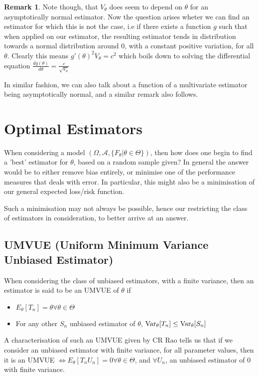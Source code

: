 \documentclass[12pt]{book}
\theoremstyle{definition}
\newtheorem*{remark}{Remark}
\begin{document}
\begin{remark}
    Note though, that $V_{\theta}$ does seem to depend on $\theta$ for an asymptotically normal estimator. Now the question arises wheter we can find an estimator for which this is not the case, i.e if there exists a function $g$ such that when applied on our estimator, the resulting estimator tends in distribution towards a normal distribution around 0, with a constant positive variation, for all $\theta$. Clearly this means $g'(\theta)^2 V_{\theta} = c^2$ which boils down to solving the differential equation $\frac{d g(\theta)}{d\theta} = \frac{c}{\sqrt{V_{\theta}}}$
\end{remark}

In similar fashion, we can also talk about a function of a multivariate estimator being asymptotically normal, and a similar remark also follows.

\section{Optimal Estimators}
When considering a model $(\Omega, \mathcal{A}, \{F_{\theta}| \theta \in \Theta \})$, then how does one begin to find a 'best' estimator for $\theta$, based on a random sample given? In general the answer would be to either remove bias entirely, or minimise one of the performance measures that deals with error. In particular, this might also be a minimisation of our general expected loss/risk function.

Such a minimisation may not always be possible, hence our restricting the class of estimators in consideration, to better arrive at an answer.
\subsection{UMVUE (Uniform Minimum Variance Unbiased Estimator)}
When considering the class of unbiased estimators, with a finite variance, then an estimator is said to be an UMVUE of $\theta$ if \begin{itemize}
    \item $E_{\theta}[T_n] = \theta \forall \theta \in \Theta$
    \item For any other $S_n$ unbiased estimator of $\theta$, $\textnormal{Var}_{\theta}[T_n] \leq \textnormal{Var}_{\theta}[S_n]$
\end{itemize}
A characterisation of such an UMVUE given by CR Rao tells us that if we consider an unbiased estimator with finite variance, for all parameter values, then it is an UMVUE $\iff E_{\theta}[T_nU_n] = 0 \forall \theta \in \Theta$, and $\forall U_n$, an unbiased estimator of 0 with finite variance.
\end{document}
